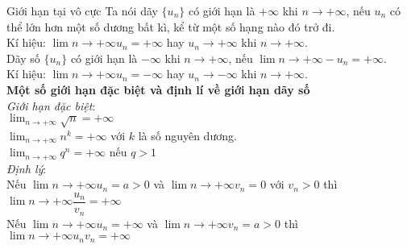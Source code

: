 \begin{dang}{Giới hạn tại vô cực}
		Ta nói dãy $\{u_n\}$ có giới hạn là $+ \infty$ khi $n \rightarrow + \infty$, nếu $u_n$ có thể lớn hơn một số dương bất kì, kể từ một số hạng nào đó trở đi. \\
	Kí hiệu: $\lim \limits{n \to +\infty}u_n = + \infty$ hay $u_n \rightarrow + \infty$ khi $n \rightarrow + \infty$. \\ 
	Dãy số $\{u_n\}$ có giới hạn là $- \infty$ khi $n \rightarrow + \infty$, nếu $\lim \limits{n \to +\infty}- u_n = + \infty$. \\
	Kí hiệu: $\lim \limits{n \to +\infty}u_n = - \infty$ hay $u_n \rightarrow - \infty$ khi $n \rightarrow + \infty$. \\ 
	\textbf{Một số giới hạn đặc biệt và định lí về giới hạn dãy số} \\
	\textit{Giới hạn đặc biệt}: \\
	$\displaystyle \lim_{n \rightarrow + \infty} \sqrt{n} = + \infty$ \\
	$\displaystyle \lim_{n \rightarrow + \infty} n^k = + \infty$ với $k$ là số nguyên dương. \\
	$\displaystyle \lim_{n \rightarrow + \infty} q^n = + \infty$ nếu $q > 1$ \\
	\textit{Định lý}: \\
	Nếu $\lim \limits{n \to +\infty}u_n = a > 0$ và $\lim \limits{n \to +\infty}v_n = 0$ với $v_n > 0$ thì $\lim \limits{n \to +\infty}\dfrac{u_n}{v_n} = + \infty$ \\
	Nếu $\lim \limits{n \to +\infty}u_n = + \infty$ và $\lim \limits{n \to +\infty}v_n = a > 0$ thì $\lim \limits{n \to +\infty}u_nv_n = + \infty$ \\
\end{dang}

